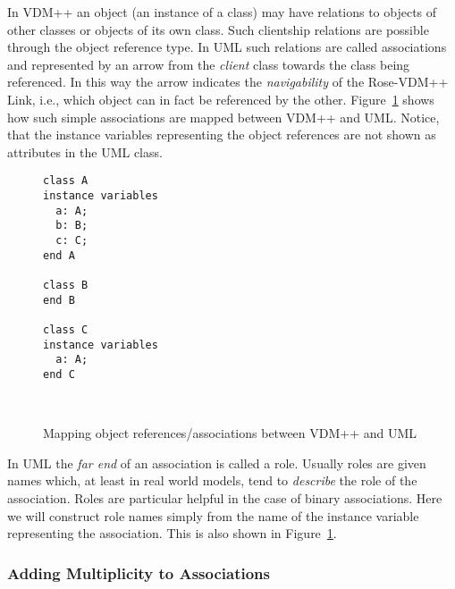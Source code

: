 \documentclass[\pformat,12pt]{article}
\newcommand{\vdmpp}{VDM++}
\newcommand{\link}{Rose-\vdmpp{} Link}
\begin{document}
In \vdmpp{} an object (an instance of a class) may have relations to
objects of other classes or objects of its own class. Such clientship
relations are possible through the object reference type. In UML such
relations are called associations and represented by an arrow from the
{\it client} class towards the class being referenced. In this way the
arrow indicates the {\it navigability} of the \link{}, i.e., which
object can in fact be referenced by the other. Figure~\ref{fig:classA}
shows how such simple associations are mapped between \vdmpp{} and
UML. Notice, that the instance variables representing the object
references are not shown as attributes in the UML class.

\begin{figure}[htb]
\begin{center}
\hspace{-2cm}
\begin{minipage}[t]{2in}
\begin{verbatim}
class A  
instance variables  
  a: A;  
  b: B;  
  c: C;  
end A  
  
class B  
end B  
  
class C  
instance variables  
  a: A;  
end C  
\end{verbatim}
\end{minipage} \ \
\begin{minipage}[t]{2in}
\vspace{1cm}
\end{minipage}
\caption{Mapping object references/associations between \vdmpp{} and UML\label{fig:classA}}
\end{center}
\end{figure}


\renewcommand{\textfraction}{0}
                              

\renewcommand{\topfraction}{1}
                              

\setcounter{totalnumber}{100} 
\setcounter{topnumber}{100} 
   
In UML the {\it far end} of an association is called a role. Usually
roles are given names which, at least in real world models, tend to
{\em describe} the role of the association. Roles are particular
helpful in the case of binary associations. Here we will construct
role names simply from the name of the instance variable representing
the association. This is also shown in Figure~\ref{fig:classA}.

\subsubsection*{Adding Multiplicity to Associations}
  
\end{document}
